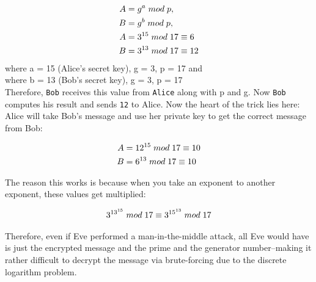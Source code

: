 \documentclass[10pt]{article}
\begin{document}
\begin{align*}
    A &= g^{a} \thickspace mod \thickspace p,  \\
    B &= g^{b} \thickspace mod \thickspace p,  \\
    A &= 3^{15} \thickspace mod \thickspace 17 \equiv 6 \\
    B &= 3^{13} \thickspace mod \thickspace 17 \equiv 12 \\
\end{align*}
where a = 15 (Alice's secret key), g = 3, p = 17 and \\
where b = 13 (Bob's secret key),   g = 3, p = 17 \\

Therefore, \texttt{Bob} receives this value from \texttt{Alice} along with p
and g. Now \texttt{Bob} computes his result and sends \texttt{12} to Alice. Now
the heart of the trick lies here: Alice will take Bob's message and use her
private key to get the correct message from Bob:

\begin{align*}
    A &= 12^{15} \thickspace mod \thickspace 17 \equiv 10 \\
    B &= 6^{13} \thickspace  mod \thickspace 17 \equiv 10
\end{align*}

The reason this works is because when you take an exponent to another exponent, these values get
multiplied:

\begin{align*}
    3^{13^{15}} \thickspace mod \thickspace 17 \equiv 3^{15^{13}} \thickspace mod \thickspace 17
\end{align*}

Therefore, even if Eve performed a man-in-the-middle attack, all Eve would have
is just the encrypted message and the prime and the generator number--making it
rather difficult to decrypt the message via brute-forcing due to the discrete
logarithm problem.

\end{document}
